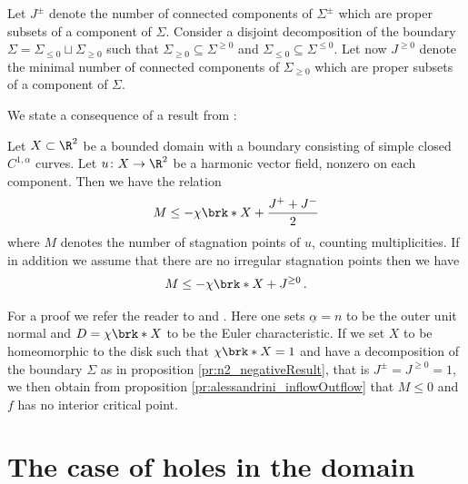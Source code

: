 \begin{definition}
Let $J^\pm$ denote the number of connected components of $\Sigma^\pm$ which are proper
subsets of a component of $\Sigma$.
Consider a disjoint decomposition of the boundary $\Sigma=\Sigma_{\leq0}\sqcup\Sigma_{\geq0}$ such
that $\Sigma_{\geq0}\subseteq\Sigma^{\geq0}$ and $\Sigma_{\leq0}\subseteq\Sigma^{\leq0}$.
Let now $J^{\geq0}$ denote the minimal number of connected components of $\Sigma_{\geq0}$ 
which are proper subsets of a component of $\Sigma$.
\end{definition}

We state a consequence of a result from \cite[Theorem 2.1 and 2.2]{Alessandrini1992}:
\begin{proposition}\label{pr:alessandrini_inflowOutflow}
  Let $X\subset\R^2$ be a bounded domain with a boundary consisting of simple closed $C^{1,\alpha}$ curves.
  Let $u\colon X\to \R^2$ be a harmonic vector field, nonzero on each component.
  Then we have the relation
  \begin{align}
    M\leq -\chi\brk*{X}+\frac{J^++J^-}{2}\label{eq:n2_Alessandrini1}
  \end{align}
  where $M$ denotes the number of stagnation points of $u$, counting multiplicities.
  If in addition we assume that there are no irregular stagnation points then we have
  \begin{align}
    M\leq -\chi\brk*{X}+J^{\geq0}\,.\label{eq:n2_Alessandrini2}
  \end{align}
\end{proposition}
  For a proof we refer the reader to \cite[Theorem 2.1]{Alessandrini1992} and \cite[Theorem 2.2]{Alessandrini1992}. Here one sets $\underline{\alpha}=n$ to be the outer unit normal and $D=\chi\brk*{X}$
  to be the Euler characteristic.
% 
If we set $X$ to be homeomorphic to the disk such that $\chi\brk*{X}=1$ and have a
decomposition of the boundary $\Sigma$ as in proposition \ref{pr:n2_negativeResult}, that is $J^\pm=J^{\geq0}=1$,
we then obtain from proposition \ref{pr:alessandrini_inflowOutflow} that $M\leq0$
and $f$ has no interior critical point.

\section{The case of holes in the domain}

